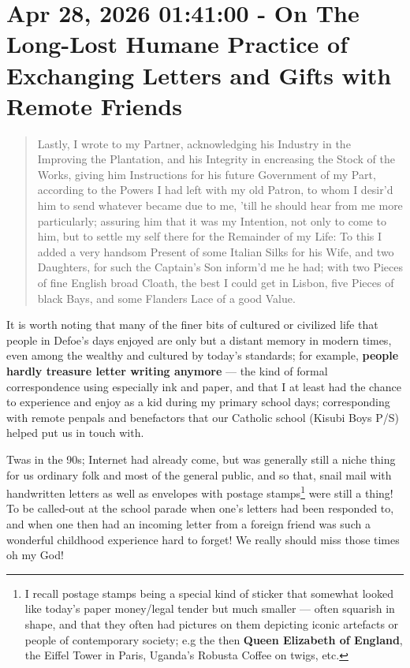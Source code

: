 \documentclass[a4paper]{article}
\begin{document}
\section{Apr 28, 2026 01:41:00 - On The Long-Lost Humane Practice of Exchanging Letters and Gifts with Remote Friends}
\label{SEC73}


\noindent
\begin{minipage}{1\textwidth}
\vspace{1em}
\begin{quotation}
{\ttfamily


Lastly, I wrote to my Partner, acknowledging his Industry in the Improving the Plantation, and his Integrity in encreasing the Stock of the Works, giving him Instructions for his future Government of my Part, according to the Powers I had left with my old Patron, to whom I desir’d him to send whatever became due to me, ’till he should hear from me more particularly; assuring him that it was my Intention, not only to come to him, but to settle my self there for the Remainder of my Life: To this I added a very handsom Present of some Italian Silks for his Wife, and two Daughters, for such the Captain’s Son inform’d me he had; with two Pieces of fine English broad Cloath, the best I could get in Lisbon, five Pieces of black Bays, and some Flanders Lace of a good Value.


}
\end{quotation}
\vspace{1em}
\end{minipage}


It is worth noting that many of the finer bits of cultured or civilized life that people in Defoe's days enjoyed are only but a distant memory in modern times, even among the wealthy and cultured by today's standards; for example, \textbf{people hardly treasure letter writing anymore} --- the kind of formal correspondence using especially ink and paper, and that I at least had the chance to experience and enjoy as a kid during my primary school days; corresponding with remote penpals and benefactors that our Catholic school (Kisubi Boys P/S) helped put us in touch with. 

Twas in the 90s; Internet had already come, but was generally still a niche thing for us ordinary folk and most of the general public, and so that, snail mail with handwritten letters as well as envelopes with postage stamps\footnote{I recall postage stamps being a special kind of sticker that somewhat looked like today's paper money/legal tender but much smaller --- often squarish in shape, and that they often had pictures on them depicting iconic artefacts or people of contemporary society; e.g the then \textbf{Queen Elizabeth of England}, the Eiffel Tower in Paris, Uganda's Robusta Coffee on twigs, etc.} were still a thing! To be called-out at the school parade when one's letters had been responded to, and when one then had an incoming letter from a foreign friend was such a wonderful childhood experience hard to forget! We really should miss those times oh my God! 
\end{document}
